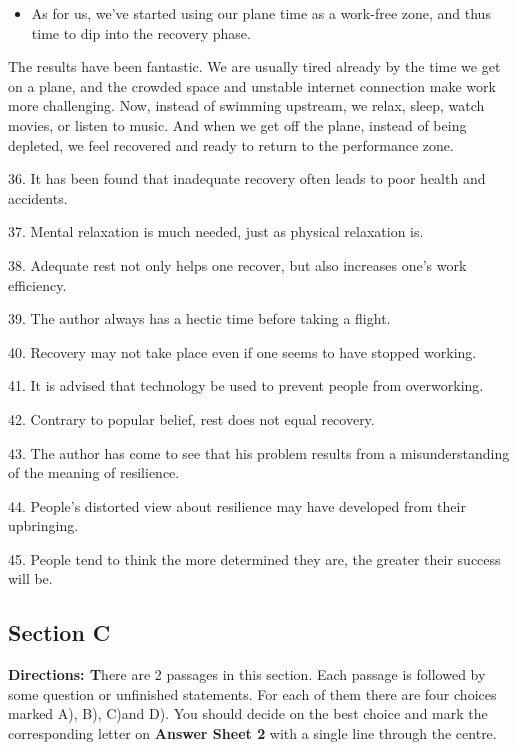 \documentclass[UTF8,11pt]{ctexart}
\begin{document}
\begin{itemize}[leftmargin=2em,itemsep=.2em,topsep=.4em]\item[M.] As for us, we’ve started using our plane time as a work-free zone, and thus time to dip into the recovery phase.
\end{itemize}

The results have been fantastic. We are usually tired already by the time we get on a plane, and the crowded space and unstable internet connection make work more challenging. Now, instead of swimming upstream, we relax, sleep, watch movies, or listen to music. And when we get off the plane, instead of being depleted, we feel recovered and ready to return to the performance zone.


36. It has been found that inadequate recovery often leads to poor health and accidents.


37. Mental relaxation is much needed, just as physical relaxation is.


38. Adequate rest not only helps one recover, but also increases one’s work efficiency.


39. The author always has a hectic time before taking a flight.


40. Recovery may not take place even if one seems to have stopped working.


41. It is advised that technology be used to prevent people from overworking.


42. Contrary to popular belief, rest does not equal recovery.


43. The author has come to see that his problem results from a misunderstanding of the meaning of resilience.


44. People’s distorted view about resilience may have developed from their upbringing.


45. People tend to think the more determined they are, the greater their success will be.


\subsection*{\textbf{Section C}}


\textbf{Directions: T}here are 2 passages in this section. Each passage is followed by some question or unfinished statements. For each of them there are four choices marked A), B), C)and D). You should decide on the best choice and mark the corresponding letter on\textbf{ Answer Sheet 2} with a single line through the centre.
\end{document}
